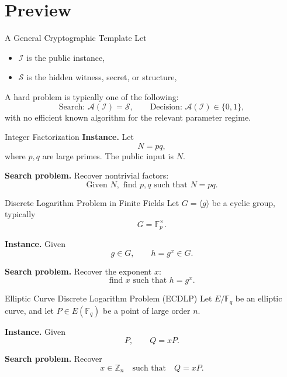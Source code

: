 \documentclass[serif, aspectratio=169]{beamer}
\begin{document}
\section{Preview}

\begin{frame}{A General Cryptographic Template}
	Let
	\begin{itemize}
		\item $\mathcal{I}$ is the public instance,
		\item $\mathcal{S}$ is the hidden witness, secret, or structure,
	\end{itemize}
	
	\vspace{0.5em}
	A hard problem is typically one of the following:
	\[
	\text{Search: } \mathcal{A}(\mathcal{I}) = \mathcal{S},
	\qquad
	\text{Decision: } \mathcal{A}(\mathcal{I}) \in \{0,1\},
	\]
	with no efficient known algorithm for the relevant parameter regime.
\end{frame}

\begin{frame}{Integer Factorization}
	\textbf{Instance.}
	Let
	\[
	N = pq,
	\]
	where $p,q$ are large primes. The public input is $N$.
	
	\vspace{2.4em}
	\textbf{Search problem.}
	Recover nontrivial factors:
	\[
	\text{Given } N, \text{ find } p,q \text{ such that } N=pq.
	\]
\end{frame}

\begin{frame}{Discrete Logarithm Problem in Finite Fields}
	Let $G = \langle g \rangle$ be a cyclic group, typically
	\[
	G = \mathbb{F}_p^\times.
	\]
	
	\textbf{Instance.}
	Given
	\[
	g \in G, \qquad h = g^x \in G.
	\]
	
	\vspace{2.4em}
	\textbf{Search problem.}
	Recover the exponent $x$:\[
	\text{find } x \text{ such that } h=g^x.
	\]
\end{frame}

\begin{frame}{Elliptic Curve Discrete Logarithm Problem (ECDLP)}
	Let $E/\mathbb{F}_q$ be an elliptic curve, and let $
	P \in E(\mathbb{F}_q)$
	be a point of large order $n$.
	
	\vspace{2.4em}
	\textbf{Instance.}
	Given
	\[
	P, \qquad Q = xP.
	\]
	
	\vspace{2.4em}
	\textbf{Search problem.}
	Recover
	\[
	x \in \mathbb{Z}_n
	\quad \text{such that} \quad
	Q = xP.
	\]
\end{frame}
\end{document}
